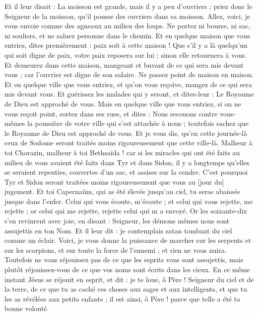 \begin{multicols}{2}
Et il leur disait : La moisson est grande, mais il y a peu d'ouvriers ; priez donc le Seigneur de la moisson, qu'il pousse des ouvriers dans sa moisson.
Allez, voici, je vous envoie comme des agneaux au milieu des loups.
Ne portez ni bourse, ni sac, ni souliers, et ne saluez personne dans le chemin.
Et en quelque maison que vous entriez, dites premièrement : paix soit à cette maison !
Que s'il y a là quelqu'un qui soit digne de paix, votre paix reposera sur lui ; sinon elle retournera à vous.
Et demeurez dans cette maison, mangeant et buvant de ce qui sera mis devant vous ; car l'ouvrier est digne de son salaire. Ne passez point de maison en maison.
Et en quelque ville que vous entriez, et qu'on vous reçoive, mangez de ce qui sera mis devant vous.
Et guérissez les malades qui y seront, et dites-leur : Le Royaume de Dieu est approché de vous.
Mais en quelque ville que vous entriez, si on ne vous reçoit point, sortez dans ses rues, et dites :
Nous secouons contre vous-mêmes la poussière de votre ville qui s'est attachée à nous ; toutefois sachez que le Royaume de Dieu est approché de vous.
Et je vous dis, qu'en cette journée-là ceux de Sodome seront traités moins rigoureusement que cette ville-là.
Malheur à toi Chorazin, malheur à toi Bethsaïda ! car si les miracles qui ont été faits au milieu de vous avaient été faits dans Tyr et dans Sidon, il y a longtemps qu'elles se seraient repenties, couvertes d'un sac, et assises sur la cendre.
C'est pourquoi Tyr et Sidon seront traitées moins rigoureusement que vous au [jour du] jugement.
Et toi Capernaüm, qui as été élevée jusqu'au ciel, tu seras abaissée jusque dans l'enfer.
Celui qui vous écoute, m'écoute ; et celui qui vous rejette, me rejette ; or celui qui me rejette, rejette celui qui m a envoyé.
Or les soixante-dix s'en revinrent avec joie, en disant : Seigneur, les démons mêmes nous sont assujettis en ton Nom.
Et il leur dit : je contemplais satan tombant du ciel comme un éclair.
Voici, je vous donne la puissance de marcher sur les serpents et sur les scorpions, et sur toute la force de l'ennemi ; et rien ne vous nuira.
Toutefois ne vous réjouissez pas de ce que les esprits vous sont assujettis, mais plutôt réjouissez-vous de ce que vos noms sont écrits dans les cieux.
En ce même instant Jésus se réjouit en esprit, et dit : je te loue, ô Père ! Seigneur du ciel et de la terre, de ce que tu as caché ces choses aux sages et aux intelligents, et que tu les as révélées aux petits enfants ; il est ainsi, ô Père ! parce que telle a été ta bonne volonté.

\end{multicols}
